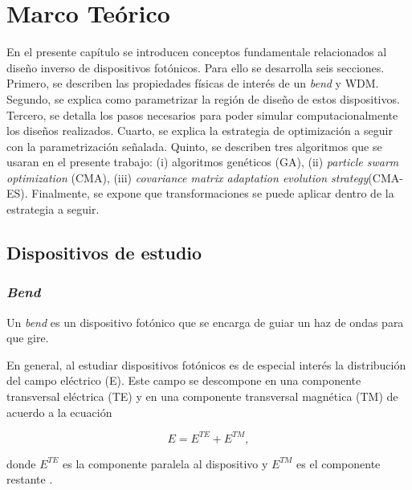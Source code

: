 \chapter{Marco  Teórico}

En el presente capítulo se introducen conceptos fundamentale relacionados al diseño inverso de dispositivos fotónicos.
Para ello se desarrolla seis secciones. 
Primero, se describen las propiedades físicas de interés de un \emph{bend} y WDM.
Segundo, se explica como parametrizar la región de diseño de estos
dispositivos.
Tercero, se detalla los pasos necesarios para poder simular computacionalmente
los diseños realizados.
Cuarto, se explica la estrategia de optimización a seguir con la
parametrización señalada.
Quinto, se describen tres algoritmos que se usaran en el presente trabajo: (i)
algoritmos genéticos (GA), (ii) \emph{particle swarm optimization} (CMA), (iii)
\emph{covariance matrix adaptation evolution strategy}(CMA-ES).
Finalmente, se expone que transformaciones se puede aplicar dentro de la
estrategia a seguir.


\section{Dispositivos de estudio}

\subsection{\emph{Bend}}

Un \emph{bend} es un dispositivo fotónico que se encarga de guiar un haz de ondas para que gire.

En general, al estudiar dispositivos fotónicos es de especial interés la
distribución del campo eléctrico (E). 
Este campo se descompone en una componente transversal eléctrica (TE) y en una componente transversal magnética (TM) de acuerdo a la ecuación

\begin{equation}
  E = E^{TE} + E^{TM},
\label{eq:field}
\end{equation}

donde $E^{TE}$ es la componente paralela al dispositivo y $E^{TM}$ es el componente restante \citep{Hohenester2020}. 

